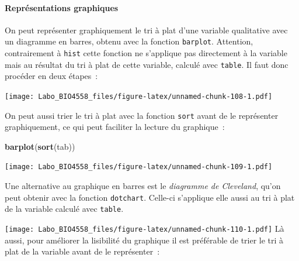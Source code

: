 \documentclass[12pt,]{book}
\newenvironment{Shaded}{\begin{snugshade}}{\end{snugshade}}
\newcommand{\KeywordTok}[1]{\textcolor[rgb]{0.27,0.27,0.27}{\textbf{#1}}}
\newcommand{\NormalTok}[1]{#1}
\newcommand{\OperatorTok}[1]{\textcolor[rgb]{0.43,0.43,0.43}{\textbf{#1}}}
\newcommand{\StringTok}[1]{\textcolor[rgb]{0.5,0.5,0.5}{#1}}
\let\oldparagraph\paragraph
\renewcommand{\paragraph}[1]{\oldparagraph{#1}\mbox{}}
\begin{document}
\hypertarget{repruxe9sentations-graphiques}{%
\paragraph{Représentations graphiques}\label{repruxe9sentations-graphiques}}

On peut représenter graphiquement le tri à plat d'une variable qualitative avec un diagramme en barres, obtenu avec la fonction \texttt{barplot}. Attention, contrairement à \texttt{hist} cette fonction ne s'applique pas directement à la variable mais au résultat du tri à plat de cette variable, calculé avec \texttt{table}. Il faut donc procéder en deux étapes~:

\begin{Shaded}
\end{Shaded}

\texttt{[image: Labo\_BIO4558\_files/figure-latex/unnamed-chunk-108-1.pdf]}

On peut aussi trier le tri à plat avec la fonction \texttt{sort} avant de le représenter graphiquement, ce qui peut faciliter la lecture du graphique~:

\begin{Shaded}
\begin{Highlighting}[]
\KeywordTok{barplot}\NormalTok{(}\KeywordTok{sort}\NormalTok{(tab))}
\end{Highlighting}
\end{Shaded}

\texttt{[image: Labo\_BIO4558\_files/figure-latex/unnamed-chunk-109-1.pdf]}

Une alternative au graphique en barres est le \emph{diagramme de Cleveland}, qu'on peut obtenir avec la fonction \texttt{dotchart}. Celle-ci s'applique elle aussi au tri à plat de la variable calculé avec \texttt{table}.

\begin{Shaded}
\end{Shaded}

\texttt{[image: Labo\_BIO4558\_files/figure-latex/unnamed-chunk-110-1.pdf]}
Là aussi, pour améliorer la lisibilité du graphique il est préférable de trier le tri à plat de la variable avant de le représenter~:
\end{document}
